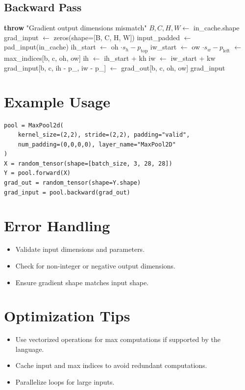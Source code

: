 \documentclass{article}
\begin{document}
\subsection{Backward Pass}
\begin{algorithm}
\caption{Backward Pass}
\begin{algorithmic}[1]
        \State \textbf{throw} "Gradient output dimensions mismatch"
    \EndIf
    \State $B, C, H, W \gets$ in_cache.shape
    \State grad_input $\gets$ zeros(shape=[B, C, H, W])
    \State input_padded $\gets$ pad_input(in_cache)
                    \State ih_start $\gets$ oh $\cdot s_h - p_{\text{top}}$
                    \State iw_start $\gets$ ow $\cdot s_w - p_{\text{left}}$
                    \State [kh, kw] $\gets$ max_indices[b, c, oh, ow]
                    \State ih $\gets$ ih_start + kh
                    \State iw $\gets$ iw_start + kw
                        \State grad_input[b, c, ih - p_{}, iw - p_{}] $\gets$ grad_out[b, c, oh, ow]
                    \EndIf
                \EndFor
            \EndFor
        \EndFor
    \EndFor
    \State \Return grad_input
\EndFunction
\end{algorithmic}
\end{algorithm}

\section{Example Usage}
\begin{verbatim}
pool = MaxPool2d(
    kernel_size=(2,2), stride=(2,2), padding="valid",
    num_padding=(0,0,0,0), layer_name="MaxPool2D"
)
X = random_tensor(shape=[batch_size, 3, 28, 28])
Y = pool.forward(X)
grad_out = random_tensor(shape=Y.shape)
grad_input = pool.backward(grad_out)
\end{verbatim}

\section{Error Handling}
\begin{itemize}
    \item Validate input dimensions and parameters.
    \item Check for non-integer or negative output dimensions.
    \item Ensure gradient shape matches input shape.
\end{itemize}

\section{Optimization Tips}
\begin{itemize}
    \item Use vectorized operations for max computations if supported by the language.
    \item Cache input and max indices to avoid redundant computations.
    \item Parallelize loops for large inputs.
\end{itemize}
\end{document}
